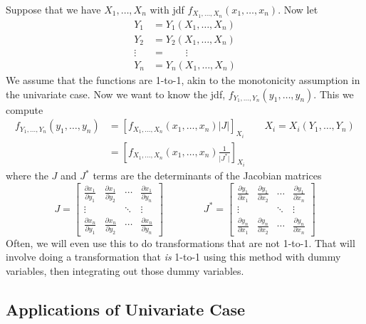 \documentclass[a4paper,12pt]{scrartcl}
\begin{document}
Suppose that we have $X_1, \ldots, X_n$ with jdf $f_{X_1, \ldots, X_n}(
x_1, \ldots, x_n)$. Now let
\begin{align*}
   Y_1 &= Y_1(X_1, \ldots, X_n) \\
   Y_2 &= Y_2(X_1, \ldots, X_n)\\
   \vdots &= \qquad \vdots\\
   Y_n &= Y_n(X_1, \ldots, X_n)
\end{align*}
We assume that the functions are 1-to-1, akin to the monotonicity
assumption in the univariate case. Now we want to know the
jdf, $f_{Y_1, \ldots, Y_n}(y_1, \ldots, y_n)$. This we compute
\begin{align*}
   f_{Y_1, \ldots, Y_n}(y_1, \ldots, y_n) &= \left[
      f_{X_1, \ldots, X_n}(x_1, \ldots, x_n) \lvert J \rvert
      \right]_{X_i}
      \qquad X_i = X_i(Y_1, \ldots, Y_n)\\
   &= \left[
      f_{X_1, \ldots, X_n}(x_1, \ldots, x_n)\frac{1}{\lvert J^*\rvert}
      \right]_{X_i}
\end{align*}
where the $J$ and $J^*$ terms are the determinants of the Jacobian
matrices
\begin{equation}
   J = \begin{bmatrix} \frac{\partial x_1}{\partial y_1} &
      \frac{\partial x_1}{\partial y_2} & \cdots &
      \frac{\partial x_1}{\partial y_n} \\
      \vdots & & \ddots & \vdots \\
      \frac{\partial x_n}{\partial y_1} &
      \frac{\partial x_n}{\partial y_2} & \cdots &
      \frac{\partial x_n}{\partial y_n}
   \end{bmatrix} \qquad \qquad
   J^* = \begin{bmatrix} \frac{\partial y_1}{\partial x_1} &
      \frac{\partial y_1}{\partial x_2} & \cdots &
      \frac{\partial y_1}{\partial x_n} \\
      \vdots & & \ddots & \vdots \\
      \frac{\partial y_n}{\partial x_1} &
      \frac{\partial y_n}{\partial x_2} & \cdots &
      \frac{\partial y_n}{\partial x_n}
   \end{bmatrix}
\end{equation}
Often, we will even use this to do transformations that are not
1-to-1. That will involve doing a transformation that \emph{is}
1-to-1 using this method with dummy variables, then integrating
out those dummy variables.




\newpage
\subsection{Applications of Univariate Case}
\end{document}
